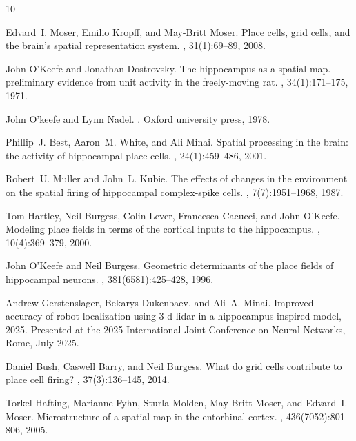 \documentclass[conference]{IEEEtran}
\begin{document}
\begin{thebibliography}{10}

Edvard~I. Moser, Emilio Kropff, and May-Britt Moser.
\newblock Place cells, grid cells, and the brain's spatial representation
  system.
, 31(1):69--89, 2008.

John {O'Keefe} and Jonathan Dostrovsky.
\newblock The hippocampus as a spatial map. preliminary evidence from unit
  activity in the freely-moving rat.
, 34(1):171--175, 1971.

John O'keefe and Lynn Nadel.
.
\newblock Oxford university press, 1978.

Phillip~J. Best, Aaron~M. White, and Ali Minai.
\newblock Spatial processing in the brain: the activity of hippocampal place
  cells.
, 24(1):459--486, 2001.

Robert~U. Muller and John~L. Kubie.
\newblock The effects of changes in the environment on the spatial firing of
  hippocampal complex-spike cells.
, 7(7):1951--1968, 1987.

Tom Hartley, Neil Burgess, Colin Lever, Francesca Cacucci, and John O'Keefe.
\newblock Modeling place fields in terms of the cortical inputs to the
  hippocampus.
, 10(4):369--379, 2000.

John O'Keefe and Neil Burgess.
\newblock Geometric determinants of the place fields of hippocampal neurons.
, 381(6581):425--428, 1996.

Andrew Gerstenslager, Bekarys Dukenbaev, and Ali~A. Minai.
\newblock Improved accuracy of robot localization using 3‐d lidar in a
  hippocampus‐inspired model, 2025.
\newblock Presented at the 2025 International Joint Conference on Neural
  Networks, Rome, July 2025.

Daniel Bush, Caswell Barry, and Neil Burgess.
\newblock What do grid cells contribute to place cell firing?
, 37(3):136--145, 2014.

Torkel Hafting, Marianne Fyhn, Sturla Molden, May-Britt Moser, and Edvard~I.
  Moser.
\newblock Microstructure of a spatial map in the entorhinal cortex.
, 436(7052):801--806, 2005.


\end{thebibliography}
\end{document}
